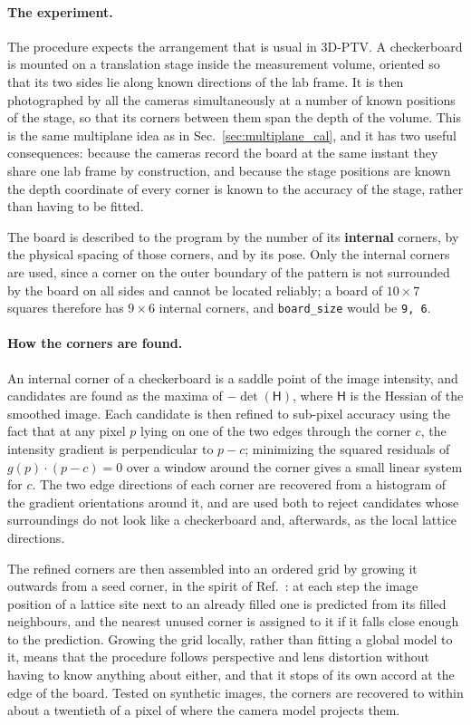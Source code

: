 \documentclass[10pt,a4paper]{article}
\begin{document}
\paragraph{The experiment.} The procedure expects the arrangement that is usual in 3D-PTV. A checkerboard is mounted on a translation stage inside the measurement volume, oriented so that its two sides lie along known directions of the lab frame. It is then photographed by all the cameras simultaneously at a number of known positions of the stage, so that its corners between them span the depth of the volume. This is the same multiplane idea as in Sec.~\ref{sec:multiplane_cal}, and it has two useful consequences: because the cameras record the board at the same instant they share one lab frame by construction, and because the stage positions are known the depth coordinate of every corner is known to the accuracy of the stage, rather than having to be fitted.

The board is described to the program by the number of its \textbf{internal} corners, by the physical spacing of those corners, and by its pose. Only the internal corners are used, since a corner on the outer boundary of the pattern is not surrounded by the board on all sides and cannot be located reliably; a board of $10 \times 7$ squares therefore has $9 \times 6$ internal corners, and \texttt{board\_size} would be \texttt{9, 6}.

\paragraph{How the corners are found.} An internal corner of a checkerboard is a saddle point of the image intensity, and candidates are found as the maxima of $-\det(\mathsf{H})$, where $\mathsf{H}$ is the Hessian of the smoothed image. Each candidate is then refined to sub-pixel accuracy using the fact that at any pixel $p$ lying on one of the two edges through the corner $c$, the intensity gradient is perpendicular to $p - c$; minimizing the squared residuals of $g(p)\cdot(p-c) = 0$ over a window around the corner gives a small linear system for $c$. The two edge directions of each corner are recovered from a histogram of the gradient orientations around it, and are used both to reject candidates whose surroundings do not look like a checkerboard and, afterwards, as the local lattice directions.

The refined corners are then assembled into an ordered grid by growing it outwards from a seed corner, in the spirit of Ref.~\cite{Geiger2012}: at each step the image position of a lattice site next to an already filled one is predicted from its filled neighbours, and the nearest unused corner is assigned to it if it falls close enough to the prediction. Growing the grid locally, rather than fitting a global model to it, means that the procedure follows perspective and lens distortion without having to know anything about either, and that it stops of its own accord at the edge of the board. Tested on synthetic images, the corners are recovered to within about a twentieth of a pixel of where the camera model projects them.
\end{document}
